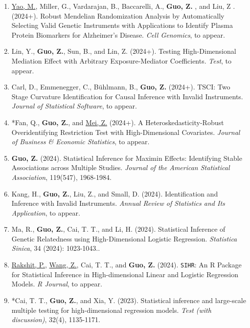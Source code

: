 \documentclass[margin, line]{res}
\begin{document}
\begin{resume}
\begin{enumerate}
			\item \underline{Yao, M.}, Miller, G., Vardarajan, B., Baccarelli, A.,
				{\bf Guo, Z.} \Envelope, and Liu, Z \Envelope. (2024+). Robust Mendelian
				Randomization Analysis by Automatically Selecting Valid Genetic Instruments
				with Applications to Identify Plasma Protein Biomarkers for Alzheimer{\textquoteright}s
				Disease. {\it Cell Genomics}, to appear.

			\item {Lin, Y.}, {\bf Guo, Z.}, Sun, B., and Lin, Z. (2024+). Testing High-Dimensional
				Mediation Effect with Arbitrary Exposure-Mediator Coefficients. {\it Test},
				to appear.

			\item Carl, D., Emmenegger, C., Bühlmann, B., {\bf Guo, Z.} (2024+). TSCI:
				Two Stage Curvature Identification for Causal Inference with Invalid Instruments.
				{\it Journal of Statistical Software}, to appear.

			\item {*}Fan, Q., {\bf Guo, Z.}, and \underline{Mei, Z.} (2024+). A Heteroskedasticity-Robust
				Overidentifying Restriction Test with High-Dimensional Covariates.
				{\it Journal of Business \& Economic Statistics}, to appear.

			\item {\bf Guo, Z.} (2024). Statistical Inference for Maximin Effects: Identifying
				Stable Associations across Multiple Studies.
				{\it Journal of the American Statistical Association}, 119(547), 1968-1984.

			\item Kang, H., {\bf Guo, Z.}, Liu, Z., and Small, D. (2024). Identification
				and Inference with Invalid Instruments.
				{\it Annual Review of Statistics and Its Application}, to appear.

			\item Ma, R., {\bf Guo, Z.}, Cai, T. T., and Li, H. (2024). Statistical
				Inference of Genetic Relatedness using High-Dimensional Logistic
				Regression. {\it Statistica Sinica}, 34 (2024): 1023-1043.. %

			\item \underline{Rakshit, P.}, \underline{Wang, Z.}, Cai, T. T., and {\bf Guo, Z.}
				(2024). \texttt{SIHR}: An R Package for Statistical Inference in High-dimensional
				Linear and Logistic Regression Models. {\it R Journal}, to appear.

			\item *Cai, T. T., {\bf Guo, Z.}, and Xia, Y. (2023). Statistical
				inference and large-scale multiple testing for high-dimensional
				regression models. {\it Test (with discussion)}, 32(4), 1135-1171.


\end{enumerate}
\end{resume}
\end{document}
